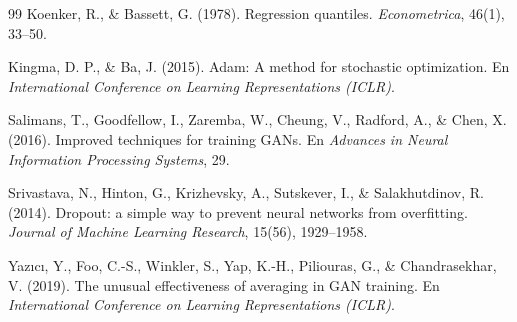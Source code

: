 \documentclass[12pt,letterpaper]{article}
\begin{document}
\begin{thebibliography}{99}
 Koenker, R., \& Bassett, G. (1978). Regression quantiles. \emph{Econometrica}, 46(1), 33--50.

 Kingma, D. P., \& Ba, J. (2015). Adam: A method for stochastic optimization. En \emph{International Conference on Learning Representations (ICLR)}.

 Salimans, T., Goodfellow, I., Zaremba, W., Cheung, V., Radford, A., \& Chen, X. (2016). Improved techniques for training GANs. En \emph{Advances in Neural Information Processing Systems}, 29.

 Srivastava, N., Hinton, G., Krizhevsky, A., Sutskever, I., \& Salakhutdinov, R. (2014). Dropout: a simple way to prevent neural networks from overfitting. \emph{Journal of Machine Learning Research}, 15(56), 1929--1958.

 Yazıcı, Y., Foo, C.-S., Winkler, S., Yap, K.-H., Piliouras, G., \& Chandrasekhar, V. (2019). The unusual effectiveness of averaging in GAN training. En \emph{International Conference on Learning Representations (ICLR)}.

\end{thebibliography}
\end{document}
